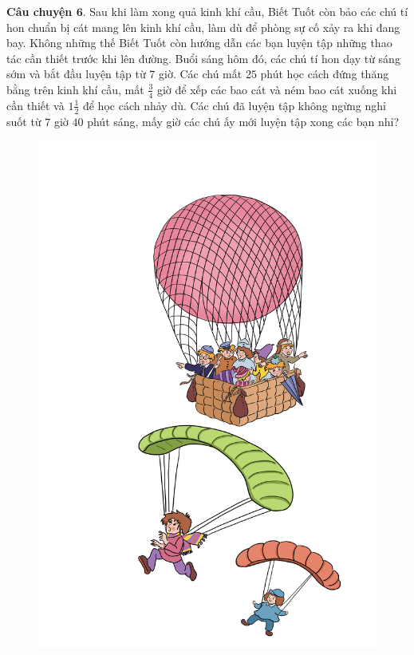 	\textbf{\color{toancuabi}Câu chuyện $\pmb{6.}$} Sau khi làm xong quả kinh khí cầu, Biết Tuốt còn bảo các chú tí hon chuẩn bị cát mang lên kinh khí cầu, làm dù để phòng sự cố xảy ra khi đang bay. Không những thế Biết Tuốt còn hướng dẫn các bạn luyện tập những thao tác cần thiết trước khi lên đường. Buổi sáng hôm đó, các chú tí hon dạy từ sáng sớm và bắt đầu luyện tập từ $7$ giờ. Các chú mất $25$ phút học cách đứng thăng bằng trên kinh khí cầu, mất $\frac{3}{4}$ giờ để xếp các bao cát và ném bao cát xuống khi cần thiết và $1\frac{1}{2}$ để học cách nhảy dù. Các chú đã luyện tập không ngừng nghỉ suốt từ $7$ giờ $40$ phút sáng, mấy giờ các chú ấy mới luyện tập xong các bạn nhỉ?
	\begin{multicols}{2}
		\begin{figure}[H]
			\centering
			\vspace*{-5pt}
			\captionsetup{labelformat= empty, justification=centering}
			\includegraphics[width=0.98\linewidth]{Hinh9_KinhKhiCau}

\end{figure}
\end{multicols}

